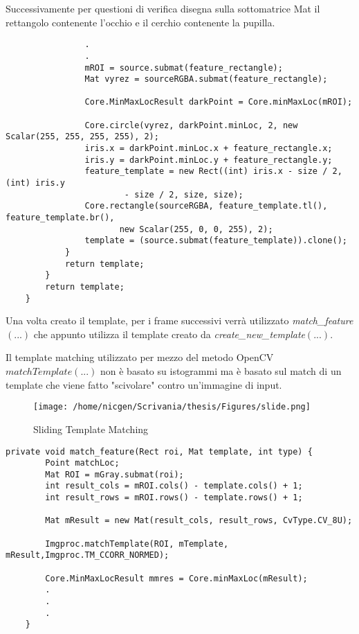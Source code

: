 Successivamente per questioni di verifica disegna sulla sottomatrice Mat il rettangolo contenente l'occhio e il cerchio contenente la pupilla.\\
         
\begin{lstlisting}    
                .    
                .
                mROI = source.submat(feature_rectangle);
                Mat vyrez = sourceRGBA.submat(feature_rectangle);
               
  	            Core.MinMaxLocResult darkPoint = Core.minMaxLoc(mROI);
            
 	            Core.circle(vyrez, darkPoint.minLoc, 2, new Scalar(255, 255, 255, 255), 2);
	            iris.x = darkPoint.minLoc.x + feature_rectangle.x;
 	            iris.y = darkPoint.minLoc.y + feature_rectangle.y;
	            feature_template = new Rect((int) iris.x - size / 2, (int) iris.y
	                    - size / 2, size, size);
	            Core.rectangle(sourceRGBA, feature_template.tl(), feature_template.br(),
 	                   new Scalar(255, 0, 0, 255), 2);
	            template = (source.submat(feature_template)).clone();
            }
            return template;
        }
        return template;
    }
\end{lstlisting}

Una volta creato il template, per i frame successivi verrà utilizzato \textit{match\_feature$(...)$} che appunto utilizza il template creato da \textit{create\_new\_template$(...)$}. 

Il template matching utilizzato per mezzo del metodo OpenCV \textit{$matchTemplate(...)$} non è basato su istogrammi ma è basato sul match di un template che viene fatto "scivolare" contro un'immagine di input.\\

\begin{figure}[H]\centering  
\texttt{[image: /home/nicgen/Scrivania/thesis/Figures/slide.png]}
\caption[Sliding Template Matching]{Sliding Template Matching}
\label{pic-a}
\end{figure}

\begin{lstlisting}
private void match_feature(Rect roi, Mat template, int type) {
        Point matchLoc;
        Mat ROI = mGray.submat(roi);
        int result_cols = mROI.cols() - template.cols() + 1;
        int result_rows = mROI.rows() - template.rows() + 1;
		
        Mat mResult = new Mat(result_cols, result_rows, CvType.CV_8U);
 
        Imgproc.matchTemplate(ROI, mTemplate, mResult,Imgproc.TM_CCORR_NORMED);
 
        Core.MinMaxLocResult mmres = Core.minMaxLoc(mResult);
		.
		.
		.
    }
\end{lstlisting}

